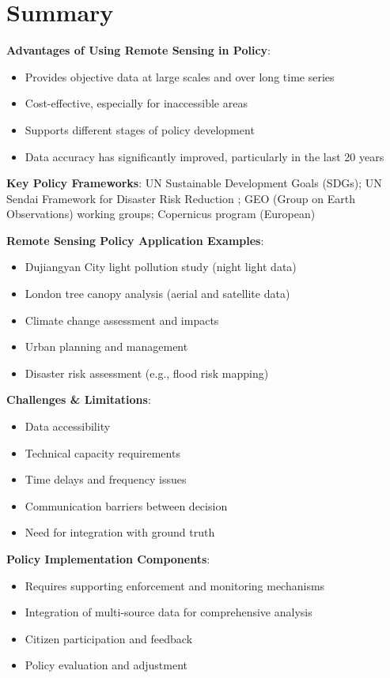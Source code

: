 \documentclass[
  letterpaper,
]{scrbook}
\begin{document}
\section{Summary}\label{summary-2}

\textbf{Advantages of Using Remote Sensing in Policy}:

\begin{itemize}
\item
  Provides objective data at large scales and over long time series
\item
  Cost-effective, especially for inaccessible areas
\item
  Supports different stages of policy development
\item
  Data accuracy has significantly improved, particularly in the last 20
  years
\end{itemize}

\textbf{Key Policy Frameworks}: UN Sustainable Development Goals (SDGs);
UN Sendai Framework for Disaster Risk Reduction ; GEO (Group on Earth
Observations) working groups; Copernicus program (European)

\textbf{Remote Sensing Policy Application Examples}:

\begin{itemize}
\item
  Dujiangyan City light pollution study (night light data)
\item
  London tree canopy analysis (aerial and satellite data)
\item
  Climate change assessment and impacts
\item
  Urban planning and management
\item
  Disaster risk assessment (e.g., flood risk mapping)
\end{itemize}

\textbf{Challenges \& Limitations}:

\begin{itemize}
\item
  Data accessibility
\item
  Technical capacity requirements
\item
  Time delays and frequency issues
\item
  Communication barriers between decision
\item
  Need for integration with ground truth
\end{itemize}

\textbf{Policy Implementation Components}:

\begin{itemize}
\item
  Requires supporting enforcement and monitoring mechanisms
\item
  Integration of multi-source data for comprehensive analysis
\item
  Citizen participation and feedback
\item
  Policy evaluation and adjustment
\end{itemize}
\end{document}
